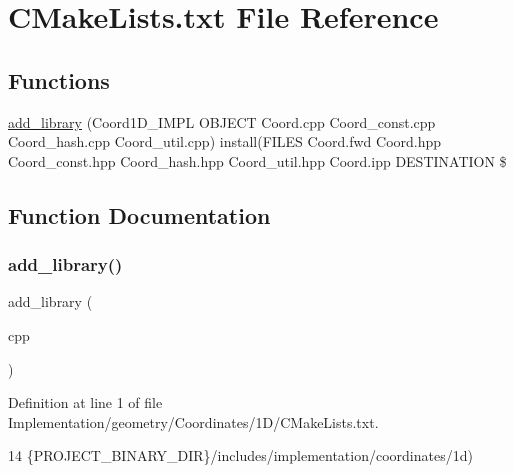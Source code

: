 \hypertarget{Implementation_2geometry_2Coordinates_21D_2CMakeLists_8txt}{}\section{C\+Make\+Lists.\+txt File Reference}
\label{Implementation_2geometry_2Coordinates_21D_2CMakeLists_8txt}
\subsection*{Functions}
\begin{DoxyCompactItemize}
\item 
\hyperlink{Implementation_2geometry_2Coordinates_21D_2CMakeLists_8txt_ad3fc387cac370c8979223e38b6c6a594}{add\+\_\+library} (Coord1\+D\+\_\+\+I\+M\+PL O\+B\+J\+E\+CT Coord.\+cpp Coord\+\_\+const.\+cpp Coord\+\_\+hash.\+cpp Coord\+\_\+util.\+cpp) install(F\+I\+L\+ES Coord.\+fwd Coord.\+hpp Coord\+\_\+const.\+hpp Coord\+\_\+hash.\+hpp Coord\+\_\+util.\+hpp Coord.\+ipp D\+E\+S\+T\+I\+N\+A\+T\+I\+ON \$
\end{DoxyCompactItemize}


\subsection{Function Documentation}
\mbox{\label{Implementation_2geometry_2Coordinates_21D_2CMakeLists_8txt_ad3fc387cac370c8979223e38b6c6a594}} 
\subsubsection{\texorpdfstring{add\+\_\+library()}{add\_library()}}
{\footnotesize\ttfamily add\+\_\+library (\begin{DoxyParamCaption}\item[{Coord1\+D\+\_\+\+I\+M\+PL O\+B\+J\+E\+CT Coord.\+cpp Coord\+\_\+const.\+cpp Coord\+\_\+hash.\+cpp Coord\+\_\+util.}]{cpp }\end{DoxyParamCaption})}



Definition at line 1 of file Implementation/geometry/\+Coordinates/1\+D/\+C\+Make\+Lists.\+txt.


\begin{DoxyCode}
14                \{PROJECT\_BINARY\_DIR\}/includes/implementation/coordinates/1d)
\end{DoxyCode}
